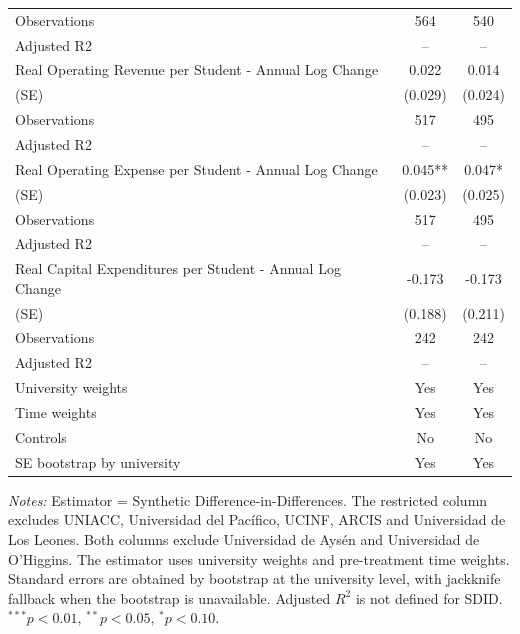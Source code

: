 \begin{table}[!htbp]
\begin{tabular}{lcc}
Observations & 564 & 540 \\
Adjusted R2 & -- & -- \\
Real Operating Revenue per Student - Annual Log Change & 0.022 & 0.014 \\
(SE) & (0.029) & (0.024) \\
Observations & 517 & 495 \\
Adjusted R2 & -- & -- \\
Real Operating Expense per Student - Annual Log Change & 0.045** & 0.047* \\
(SE) & (0.023) & (0.025) \\
Observations & 517 & 495 \\
Adjusted R2 & -- & -- \\
Real Capital Expenditures per Student - Annual Log Change & -0.173 & -0.173 \\
(SE) & (0.188) & (0.211) \\
Observations & 242 & 242 \\
Adjusted R2 & -- & -- \\
University weights & Yes & Yes \\
Time weights & Yes & Yes \\
Controls & No & No \\
SE bootstrap by university & Yes & Yes \\
\bottomrule
\end{tabular}
\begin{minipage}{0.96\textwidth}
\footnotesize \textit{Notes:} Estimator = Synthetic Difference-in-Differences. The restricted column excludes UNIACC, Universidad del Pacífico, UCINF, ARCIS and Universidad de Los Leones. Both columns exclude Universidad de Aysén and Universidad de O'Higgins. The estimator uses university weights and pre-treatment time weights. Standard errors are obtained by bootstrap at the university level, with jackknife fallback when the bootstrap is unavailable. Adjusted $R^2$ is not defined for SDID. $^{***}p<0.01$, $^{**}p<0.05$, $^{*}p<0.10$.
\end{minipage}
\end{table}
